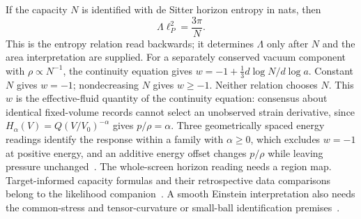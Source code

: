 \documentclass[11pt]{article}
\theoremstyle{remark}
\theoremstyle{plain}
\begin{document}
If the capacity \(N\) is identified with de Sitter horizon entropy in
nats, then
\[
 \Lambda\ell_P^2=\frac{3\pi}{N}.
\]
This is the entropy relation read backwards; it determines \(\Lambda\)
only after \(N\) and the area interpretation are supplied. For a separately
conserved vacuum component with \(\rho\propto N^{-1}\), the continuity
equation gives \(w=-1+\tfrac13d\log N/d\log a\). Constant \(N\) gives
\(w=-1\); nondecreasing \(N\) gives \(w\ge-1\). Neither relation chooses
\(N\). This \(w\) is the effective-fluid quantity of the continuity equation:
consensus about identical fixed-volume records cannot select an unobserved strain
derivative, since \(H_\alpha(V)=Q(V/V_0)^{-\alpha}\) gives \(p/\rho=\alpha\). Three
geometrically spaced energy readings identify the response within a family with
\(\alpha\ge0\), which excludes \(w=-1\) at positive energy, and an additive energy
offset changes \(p/\rho\) while leaving pressure unchanged~\cite{ophobservers}.
The whole-screen horizon reading needs a region map. Target-informed capacity formulas
and their retrospective data comparisons belong to the likelihood
companion~\cite{ophcontracts}. A smooth Einstein interpretation also needs
the common-stress and tensor-curvature or small-ball identification
premises~\cite{ophEinstein}.


\end{document}
